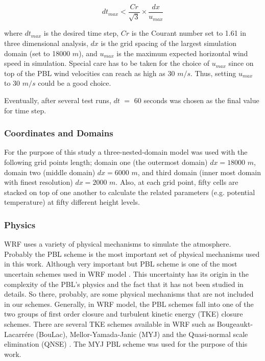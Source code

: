 \documentclass[a4paper,12pt]{article}
\numberwithin{equation}{section} %
\begin{document}

\vspace{0.25cm}
\begin{equation}
dt_{max} < \frac{Cr}{\sqrt{3}} \times \frac{dx}{u_{max}}
\end{equation}

where $dt_{max}$ is the desired time step, $Cr$ is the Courant number set to 1.61 in three dimensional analysis, $dx$ is the grid spacing of the largest simulation domain (set to 18000 $m$), and $u_{max}$ is the maximum expected horizontal wind speed in simulation. Special care has to be taken for the choice of $u_{max}$ since on top of the PBL wind velocities can reach as high as 30 $m/s$. Thus, setting $u_{max}$ to 30 $m/s$ could be a good choice.

\vspace{0.25cm}

Eventually, after several test runs, $dt$ $=$ $60$ seconds was chosen as the final value for time step.

\subsubsection{Coordinates and Domains}
For the purpose of this study a three-nested-domain model was used with the following grid points length; domain one (the outermost domain) $dx = 18000$ $m$, domain two (middle domain) $dx = 6000$ $m$, and third domain (inner most domain with finest resolution) $dx = 2000$ $m$. %
Also, at each grid point, fifty cells are stacked on top of one another to calculate the related parameters (e.g. potential temperature) at fifty different height levels.

\subsubsection{Physics}

WRF uses a variety of physical mechanisms to simulate the atmosphere. Probably the PBL scheme is the most important set of physical mechanisms used in this work. Although very important but PBL scheme is one of the most uncertain schemes used in WRF model \citep{balzar}. This uncertainty has its origin in the complexity of the PBL's physics and the fact that it has not been studied in details. So there, probably, are some physical mechanisms that are not included in our schemes. Generally, in WRF model, the PBL schemes fall into one of the two groups of first order closure and turbulent kinetic energy (TKE) closure schemes. There are several TKE schemes available in WRF such as Bougeaukt-Lacarrére (BouLac), Mellor-Yamada-Janic (MYJ) and the Quasi-normal scale elimination (QNSE) \citep{philip}. The MYJ PBL scheme was used for the purpose of this work.
\end{document}
